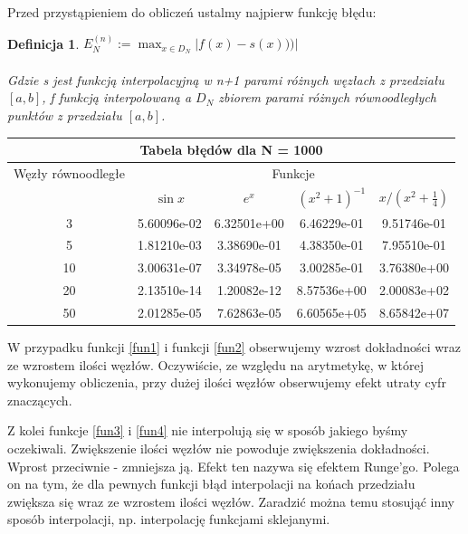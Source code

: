 \documentclass{article}
\newtheorem{defi}{Definicja}
\begin{document}
Przed przystąpieniem do obliczeń ustalmy najpierw funkcję błędu:
\begin{defi}\label{Error}
	$E_N^{(n)} := \max_{x \in D_N}|f(x)-s(x)))|$ \\
	\\
	Gdzie s jest funkcją interpolacyjną w n+1 parami różnych węzłach z przedziału $[a,b]$, f funkcją interpolowaną a $D_N$ zbiorem parami różnych równoodległych punktów z przedziału $[a,b]$.
\end{defi}

\renewcommand{\arraystretch}{1.5}  
\begin{center}
	\begin{tabular}{||c||c|c|c|c||} \hline
		\multicolumn{5}{||c||}{Tabela błędów dla N = 1000} \\ \hline
		Węzły równoodległe 	& \multicolumn{4}{|c||}{Funkcje} \\ \cline{2-5}
				& $\sin x$ & $e^x$ & $(x^{2}+1)^{-1}$ & $x/(x^{2} + \frac{1}{4})$ \\ \hline					
		3 		& 5.60096e-02 &  6.32501e+00 &  6.46229e-01 & 9.51746e-01 \\ \hline
		5 		& 1.81210e-03 &  3.38690e-01 &  4.38350e-01 & 7.95510e-01 \\ \hline
		10  	& 3.00631e-07 &  3.34978e-05 &  3.00285e-01 & 3.76380e+00 \\ \hline
		20  	& 2.13510e-14 &  1.20082e-12 &  8.57536e+00 & 2.00083e+02 \\ \hline
		50  	& 2.01285e-05 &  7.62863e-05 &  6.60565e+05 & 8.65842e+07 \\ \hline
	\end{tabular}
\end{center}
\renewcommand{\arraystretch}{1}

W przypadku funkcji \eqref{fun1} i funkcji \eqref{fun2} obserwujemy wzrost dokładności wraz ze wzrostem ilości węzłów. Oczywiście, ze względu na arytmetykę, w której wykonujemy obliczenia, przy dużej ilości węzłów obserwujemy efekt utraty cyfr znaczących.

Z kolei funkcje \eqref{fun3} i \eqref{fun4} nie interpolują się w sposób jakiego byśmy oczekiwali. Zwiększenie ilości węzłów nie powoduje zwiększenia dokładności. Wprost przeciwnie - zmniejsza ją. Efekt ten nazywa się efektem Runge'go. Polega on na tym, że dla pewnych funkcji błąd interpolacji na końach przedziału zwiększa się wraz ze wzrostem ilości węzłów.
Zaradzić można temu stosująć inny sposób interpolacji, np. interpolację funkcjami sklejanymi.
\end{document}
